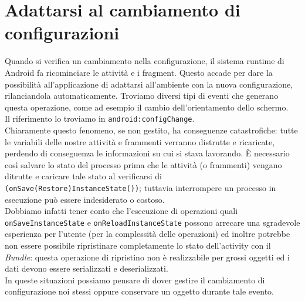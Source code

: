 %

% 


\chapter{Adattarsi al cambiamento di configurazioni}
Quando si verifica un cambiamento nella configurazione, il sistema runtime di
Android fa ricominciare le attività e i fragment. Questo accade per dare la
possibilità all'applicazione di adattarsi all'ambiente con la nuova
configurazione, rilanciandola automaticamente. Troviamo diversi tipi di eventi
che generano questa operazione, come ad esempio il cambio dell'orientamento
dello schermo.\\
Il riferimento lo troviamo in \texttt{android:configChange}.\\
Chiaramente questo fenomeno, se non gestito, ha conseguenze catastrofiche: tutte
le variabili delle nostre attività e frammenti verranno distrutte e ricaricate,
perdendo di conseguenza le informazioni su cui si stava lavorando. È necessario
così salvare lo stato del processo prima che le attività (o frammenti) vengano
ditrutte e caricare tale stato al verificarsi di
\texttt{(onSave(Restore)InstanceState())}; tuttavia interrompere un processo in
esecuzione può essere indesiderato o costoso.\\
Dobbiamo infatti tener conto che l'esecuzione di operazioni quali
\texttt{onSaveInstanceState} e \texttt{onReloadInstanceState} possono arrecare
una sgradevole esperienza per l'utente (per la complessità delle operazioni) ed
inoltre potrebbe non essere possibile ripristinare completamente lo stato
dell'activity con il \textit{Bundle}: questa operazione di ripristino non è
realizzabile per grossi oggetti ed i dati devono essere serializzati e
deserializzati.\\
In queste situazioni possiamo pensare di dover gestire il cambiamento di
configurazione noi stessi oppure conservare un oggetto durante tale evento.
